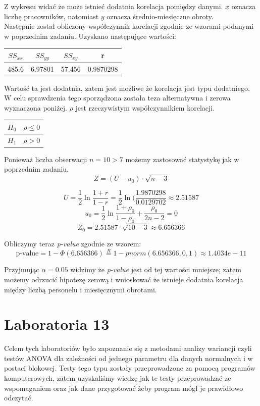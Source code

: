 \documentclass{article}
\begin{document}
Z wykresu widać że może istnieć dodatnia korelacja pomiędzy danymi. $x$ oznacza liczbę pracowników, natomiast $y$ oznacza średnio-miesięczne obroty. \\
Następnie został obliczony współczynnik korelacji zgodnie ze wzorami podanymi w poprzednim zadaniu. Uzyskano następujące wartości:
\begin{center} \begin{tabular}{|c|c|c|c|} \hline
$SS_{xx}$ & $SS_{yy}$ & $SS_{xy}$ & r \\ \hline
485.6 & 6.97801 & 57.456 & 0.9870298 \\ \hline
\end{tabular} \end{center}

Wartość ta jest dodatnia, zatem jest możliwe że korelacja jest typu dodatniego. W celu sprawdzenia tego sporządzona została teza alternatywna i zerowa wyznaczona poniżej. $\rho$ jest rzeczywistym współczynnikiem korelacji.
\begin{center} \begin{tabular}{|c|c|} \hline
$H_0$ & $\rho \leq 0$ \\ \hline
$H_1$ & $\rho > 0$ \\ \hline
\end{tabular} \end{center}

Ponieważ liczba obserwacji $n = 10 > 7$ możemy zastosować statystykę jak w poprzednim zadaniu.
\[ Z = (U - u_0) \cdot \sqrt{n-3} \]

\[U = \frac{1}{2} \ln \frac{1+r}{1-r} = \frac{1}{2} \ln(\frac{1.9870298}{0.0129702} \approx 2.51587 \]
\[ u_0 = \frac{1}{2} \ln \frac{1+\rho_0}{1-\rho_0} + \frac{\rho_0}{2n-2} = 0 \]
\[ Z_0 = 2.51587 \cdot \sqrt{10 -3} \approx 6.656366 \]

Obliczymy teraz \textit{p-value} zgodnie ze wzorem:
\[ \text{p-value} = 1 - \Phi(6.656366) \overset{R}{=} 1 - pnorm(6.656366, 0, 1) \approx 1.4034e-11 \]

Przyjmując $\alpha = 0.05$ widzimy że \textit{p-value} jest od tej wartości mniejsze; zatem możemy odrzucić hipotezę zerową i wnioskować że istnieje dodatnia korelacja między liczbą personelu i miesięcznymi obrotami.

\newpage
\part{Laboratoria 13}
Celem tych laboratoriów było zapoznanie się z metodami analizy wariancji czyli testów ANOVA dla zależności od jednego parametru dla danych normalnych i w postaci blokowej. Testy tego typu zostały przeprowadzone za pomocą programów komputerowych, zatem uzyskaliśmy wiedzę jak te testy przeprowadzać ze wspomaganiem oraz jak dane przygotować żeby program mógł je prawidłowo odczytać.
\end{document}
